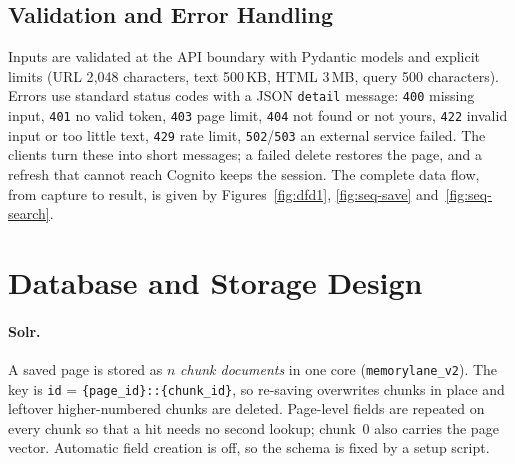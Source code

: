 \subsection{Validation and Error Handling}

Inputs are validated at the API boundary with Pydantic models and explicit
limits (URL 2{,}048 characters, text 500\,KB, HTML 3\,MB, query 500
characters). Errors use standard status codes with a JSON \texttt{detail}
message: \texttt{400} missing input, \texttt{401} no valid token,
\texttt{403} page limit, \texttt{404} not found or not yours, \texttt{422}
invalid input or too little text, \texttt{429} rate limit, \texttt{502}/\texttt{503}
an external service failed. The clients turn these into short messages; a
failed delete restores the page, and a refresh that cannot reach Cognito keeps
the session. The complete data flow, from capture to result, is given by
Figures~\ref{fig:dfd1}, \ref{fig:seq-save} and~\ref{fig:seq-search}.

\section{Database and Storage Design}
\label{sec:storage}

\paragraph{Solr.} A saved page is stored as $n$ \emph{chunk documents} in one
core (\texttt{memorylane\_v2}). The key is \texttt{id} =
\texttt{\{page\_id\}::\{chunk\_id\}}, so re-saving overwrites chunks in place
and leftover higher-numbered chunks are deleted. Page-level fields are
repeated on every chunk so that a hit needs no second lookup; chunk~0 also
carries the page vector. Automatic field creation is off, so the schema is
fixed by a setup script.

